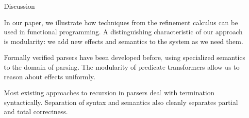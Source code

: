 \documentclass{beamer}
\begin{document}
\begin{frame}{Discussion}

In our paper, we illustrate how techniques from the refinement calculus can be used in functional programming.
A distinguishing characteristic of our approach is modularity:
we add new effects and semantics to the system as we need them.

Formally verified parsers have been developed before,
using specialized semantics to the domain of parsing.
The modularity of predicate transformers allow us to reason about effects uniformly.

Most existing approaches to recursion in parsers deal with termination syntactically.
Separation of syntax and semantics also cleanly separates partial and total correctness.

\end{frame}
\end{document}
